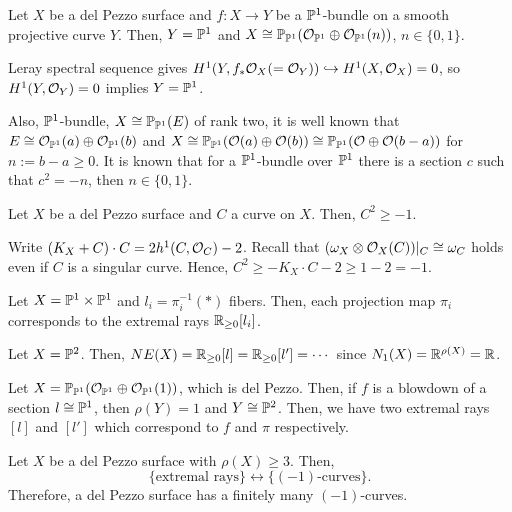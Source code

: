 \documentclass{../../small}
\begin{document}
\begin{rmk}
Let $X$ be a del Pezzo surface and $f:X\to Y$ be a $\P^1$-bundle on a smooth projective curve $Y$.
Then, $Y=\P^1$ and $X\cong\P_{\P^1}(\cO_{\P^1}\oplus\cO_{\P^1}(n))$, $n\in\{0,1\}$.
\begin{pf}[Sketch]
Leray spectral sequence gives $H^1(Y,f_*\cO_X(=\cO_Y))\hookrightarrow H^1(X,\cO_X)=0$, so $H^1(Y,\cO_Y)=0$ implies $Y=\P^1$.

Also, $\P^1$-bundle, $X\cong\P_{\P^1}(E)$ of rank two, it is well known that $E\cong\cO_{\P^1}(a)\oplus\cO_{\P^1}(b)$ and $X\cong\P_{\P^1}(\cO(a)\oplus\cO(b))\cong\P_{\P^1}(\cO\oplus\cO(b-a))$ for $n:=b-a\ge0$.
It is known that for a $\P^1$-bundle over $\P^1$ there is a section $c$ such that $c^2=-n$, then $n\in\{0,1\}$.
\end{pf}
\end{rmk}

\begin{lem}
Let $X$ be a del Pezzo surface and $C$ a curve on $X$.
Then, $C^2\ge-1$.
\end{lem}
\begin{pf}
Write $(K_X+C)\cdot C=2h^1(C,\cO_C)-2$.
Recall that $(\omega_X\otimes\cO_X(C))|_C\cong\omega_C$ holds even if $C$ is a singular curve.
Hence, $C^2\ge-K_X\cdot C-2\ge1-2=-1$.
\end{pf}

\begin{ex}
Let $X=\P^1\times\P^1$ and $l_i=\pi_i^{-1}(*)$ fibers.
Then, each projection map $\pi_i$ corresponds to the extremal rays $\R_{\ge0}[l_i]$.
\end{ex}
\begin{ex}
Let $X=\P^2$.
Then, $NE(X)=\R_{\ge0}[l]=\R_{\ge0}[l']=\cdots$ since $N_1(X)=\R^{\rho(X)}=\R$.
\end{ex}
\begin{ex}
Let $X=\P_{\P^1}(\cO_{\P^1}\oplus\cO_{\P^1}(1))$, which is del Pezzo.
Then, if $f$ is a blowdown of a section $l\cong\P^1$, then $\rho(Y)=1$ and $Y\cong\P^2$.
Then, we have two extremal rays $[l]$ and $[l']$ which correspond to $f$ and $\pi$ respectively.
\end{ex}

\begin{rmk}
Let $X$ be a del Pezzo surface with $\rho(X)\ge3$.
Then,
\[\{\text{extremal rays}\}\leftrightarrow\{\text{$(-1)$-curves}\}.\]
Therefore, a del Pezzo surface has a finitely many $(-1)$-curves.
\end{rmk}
\end{document}
